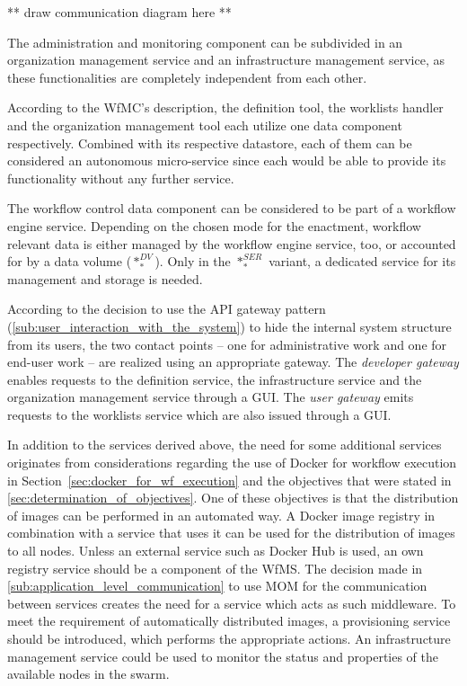     ** draw communication diagram here **

  The administration and monitoring component can be subdivided in an organization management service and an infrastructure management service, as these functionalities are completely independent from each other.

  According to the \ac{WfMC}'s description, the definition tool, the worklists handler and the organization management tool each utilize one data component respectively. Combined with its respective datastore, each of them can be considered an autonomous micro-service since each would be able to provide its functionality without any further service.

  The workflow control data component can be considered to be part of a workflow engine service.
  Depending on the chosen mode for the enactment, workflow relevant data is either managed by the workflow engine service, too, or accounted for by a data volume ($*_{*}^{DV}$). Only in the $*_{*}^{SER}$ variant, a dedicated service for its management and storage is needed.

  According to the decision to use the \ac{API} gateway pattern (\ref{sub:user_interaction_with_the_system}) to hide the internal system structure from its users, the two contact points -- one for administrative work and one for end-user work -- are realized using an appropriate gateway. The \emph{developer gateway} enables requests to the definition service, the infrastructure service and the organization management service through a \ac{GUI}. The \emph{user gateway} emits requests to the worklists service which are also issued through a \ac{GUI}.

  In addition to the services derived above, the need for some additional services originates from considerations regarding the use of Docker for workflow execution in Section~\ref{sec:docker_for_wf_execution} and the objectives that were stated in \ref{sec:determination_of_objectives}.
  One of these objectives is that the distribution of images can be performed in an automated way. A Docker image registry in combination with a service that uses it can be used for the distribution of images to all nodes. Unless an external service such as Docker Hub is used, an own registry service should be a component of the \ac{WfMS}.
  The decision made in \ref{sub:application_level_communication} to use \ac{MOM} for the communication between services creates the need for a service which acts as such middleware.
  To meet the requirement of automatically distributed images, a provisioning service should be introduced, which performs the appropriate actions. An infrastructure management service could be used to monitor the status and properties of the available nodes in the swarm.


